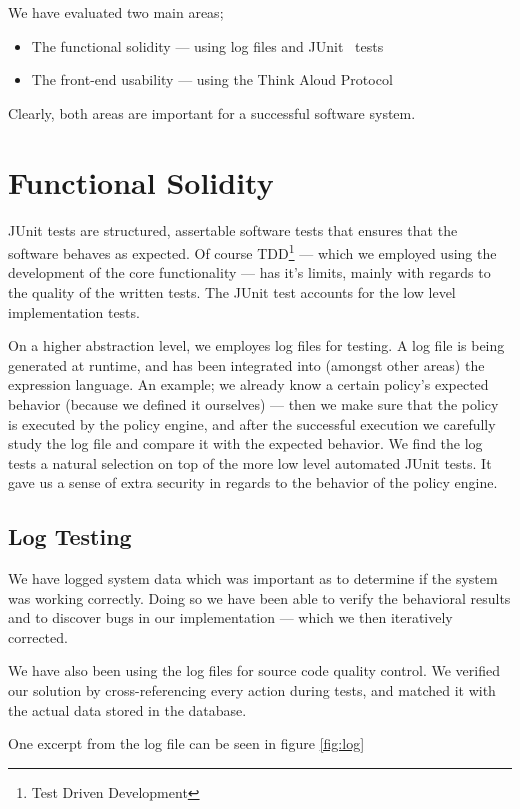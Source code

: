 We have evaluated two main areas;
\begin{itemize}
	\item The functional solidity --- using log files and JUnit~\cite{junit} tests
	\item The front-end usability --- using the Think Aloud Protocol
\end{itemize}

Clearly, both areas are important for a successful software system. 

\section{Functional Solidity}\label{policy-engine-system-evaluation}
JUnit tests are structured, assertable software tests that ensures that the software behaves as expected. Of course TDD\footnote{Test Driven Development} --- which we employed using the development of the core functionality --- has it's limits, mainly with regards to the quality of the written tests. The JUnit test accounts for the low level implementation tests.

On a higher abstraction level, we employes log files for testing. A log file is being generated at runtime, and has been integrated into (amongst other areas) the expression language. An example; we already know a certain policy's expected behavior (because we defined it ourselves) --- then we make sure that the policy is executed by the policy engine, and after the successful execution we carefully study the log file and compare it with the expected behavior. We find the log tests a natural selection on top of the more low level automated JUnit tests. It gave us a sense of extra security in regards to the behavior of the policy engine.

\subsection{Log Testing}
\label{log-test}
We have logged system data which was important as to determine if the system was working correctly. Doing so we have been able to verify the behavioral results and to discover bugs in our implementation --- which we then iteratively corrected. 

We have also been using the log files for source code quality control. We verified our solution by cross-referencing every action during tests, and matched it with the actual data stored in the database.

One excerpt from the log file can be seen in figure \ref{fig:log}


